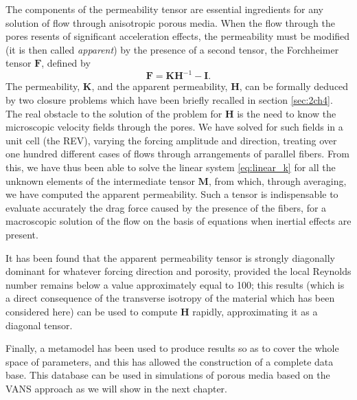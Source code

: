 The components of the permeability tensor are essential ingredients for any solution of flow
through anisotropic porous media.  When the flow through the pores resents of significant
acceleration effects, the permeability must be modified (it is then called \emph{apparent}) by the presence
of a second tensor, the Forchheimer tensor $\mathbf{F}$, defined by   
$$
\mathbf{F} =  \mathbf{K} \mathbf{H}^{-1} - \mathbf{I}.
$$
The permeability, $\mathbf{K}$, and the apparent permeability, $\mathbf{H}$, can be formally deduced by two closure problems which have
been briefly recalled in section \ref{sec:2ch4}.  The real obstacle to the solution of the problem for $\mathbf{H}$ is the need
to know the microscopic velocity fields through the pores. We have solved for such fields 
in a unit cell (the REV), varying the forcing amplitude and direction, treating over one
hundred different cases of flows through arrangements of parallel fibers. From this, we have
thus been able to solve the linear system \eqref{eq:linear_k} for all the unknown elements of the 
intermediate tensor  
$\mathbf{M}$, from which, through averaging, we have computed the apparent permeability.  Such a tensor
is  indispensable to evaluate accurately the drag force caused by the presence of the fibers, for a macroscopic solution of the flow on the
basis of equations \citet{whitaker2013method} when inertial effects are present.

It has been found that the apparent permeability tensor is strongly diagonally dominant for whatever
forcing direction and porosity,  provided the local Reynolds number remains below a value 
approximately equal to 100; this results (which is a direct
consequence of the transverse isotropy of the material which has been considered here) 
can be used to compute $\mathbf{H}$ rapidly, approximating it as a diagonal tensor.

Finally, a metamodel has been used to produce results so as to cover the whole space of parameters,
and this has allowed the construction of a complete data base. This database can be used in simulations of porous media based on the VANS approach as we will show in the next chapter. 
